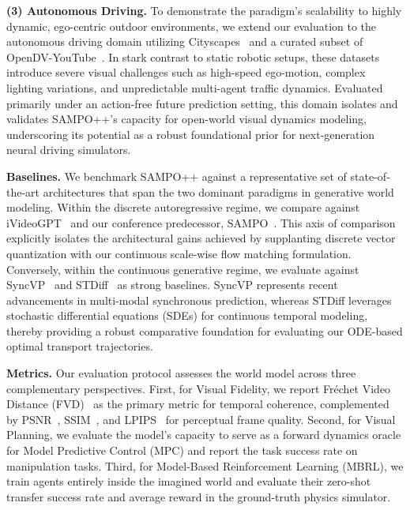 \textbf{(3) Autonomous Driving.} To demonstrate the paradigm's scalability to highly dynamic, ego-centric outdoor environments, we extend our evaluation to the autonomous driving domain utilizing Cityscapes~\cite{Cityscapes} and a curated subset of OpenDV-YouTube~\cite{yang2024genad}. In stark contrast to static robotic setups, these datasets introduce severe visual challenges such as high-speed ego-motion, complex lighting variations, and unpredictable multi-agent traffic dynamics. Evaluated primarily under an action-free future prediction setting, this domain isolates and validates SAMPO++'s capacity for open-world visual dynamics modeling, underscoring its potential as a robust foundational prior for next-generation neural driving simulators.

\textbf{Baselines.} We benchmark SAMPO++ against a representative set of state-of-the-art architectures that span the two dominant paradigms in generative world modeling. Within the discrete autoregressive regime, we compare against iVideoGPT~\cite{wu2024ivideogpt} and our conference predecessor, SAMPO~\cite{wang2025sampo}. This axis of comparison explicitly isolates the architectural gains achieved by supplanting discrete vector quantization with our continuous scale-wise flow matching formulation. Conversely, within the continuous generative regime, we evaluate against SyncVP~\cite{Pallotta_2025_CVPR} and STDiff~\cite{STDiff} as strong baselines. SyncVP represents recent advancements in multi-modal synchronous prediction, whereas STDiff leverages stochastic differential equations (SDEs) for continuous temporal modeling, thereby providing a robust comparative foundation for evaluating our ODE-based optimal transport trajectories.

\textbf{Metrics.} Our evaluation protocol assesses the world model across three complementary perspectives. First, for Visual Fidelity, we report Fréchet Video Distance (FVD)~\cite{FVDunterthiner2018towards} as the primary metric for temporal coherence, complemented by PSNR~\cite{PSNRhuynh2008scope}, SSIM~\cite{SSIMwang2004image}, and LPIPS~\cite{LPIPSzhang2018unreasonable} for perceptual frame quality. Second, for Visual Planning, we evaluate the model's capacity to serve as a forward dynamics oracle for Model Predictive Control (MPC) and report the task success rate on manipulation tasks. Third, for Model-Based Reinforcement Learning (MBRL), we train agents entirely inside the imagined world and evaluate their zero-shot transfer success rate and average reward in the ground-truth physics simulator.


